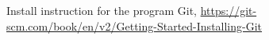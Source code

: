 \documentclass[10pt]{article}
\begin{document}
%
%
%

\begin{thebibliography}{100}
  Install instruction for the program Git, \url{https://git-scm.com/book/en/v2/Getting-Started-Installing-Git}
\end{thebibliography}
\end{document}
